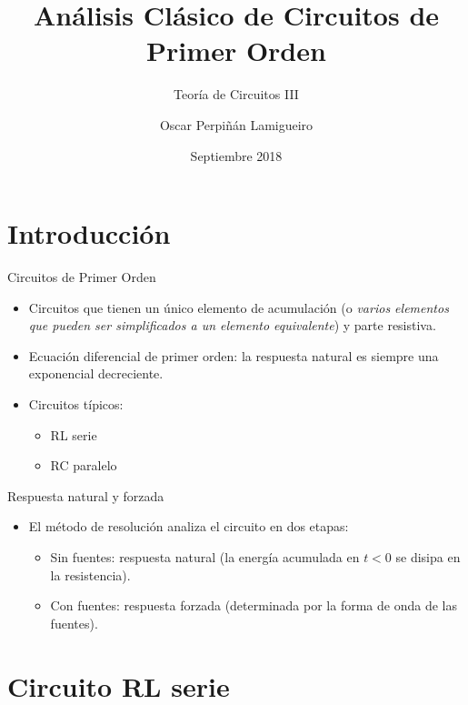 \documentclass[xcolor={usenames,svgnames,dvipsnames}]{beamer}
\author{Oscar Perpiñán Lamigueiro}
\date{Septiembre 2018}
\title{Análisis Clásico de Circuitos de Primer Orden}
\subtitle{Teoría de Circuitos III}
\begin{document}
\maketitle

\section{Introducción}
\label{sec:orgfa5e19b}

\begin{frame}[label={sec:orgaec88c0}]{Circuitos de Primer Orden}
\begin{itemize}
\item Circuitos que tienen un \alert{único elemento de acumulación} (o \emph{varios elementos que pueden ser simplificados a un elemento equivalente}) y parte resistiva.
\item \alert{Ecuación diferencial de primer orden}: la respuesta natural es siempre una \alert{exponencial decreciente}.
\item Circuitos típicos:
\begin{itemize}
\item RL serie
\item RC paralelo
\end{itemize}
\end{itemize}
\end{frame}
\begin{frame}[label={sec:org2065eaf}]{Respuesta natural y forzada}
\begin{itemize}
\item El método de resolución analiza el circuito en dos etapas:
\begin{itemize}
\item Sin fuentes: \alert{respuesta natural} (la energía acumulada en \(t < 0\) se disipa en la resistencia).
\item Con fuentes: \alert{respuesta forzada} (determinada por la forma de onda de las fuentes).
\end{itemize}
\end{itemize}
\end{frame}

\section{Circuito RL serie}
\label{sec:orgbedd728}
\end{document}
